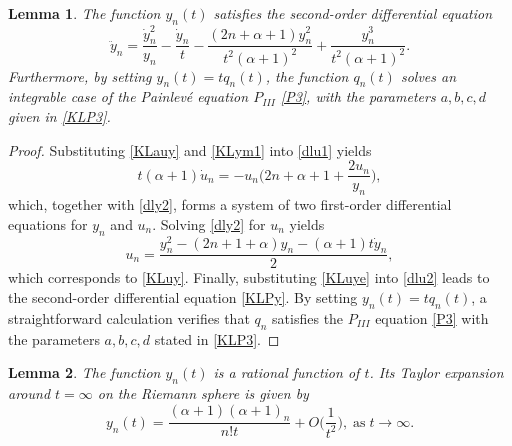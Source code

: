 \documentclass[10pt, reqno]{amsart}
\numberwithin{equation}{section}
\newtheorem{lemma}{Lemma}[section]
\numberwithin{equation}{section}
\begin{document}
\begin{lemma} \label{lemma 3.2}
The function $y_n(t)$ satisfies the second-order differential equation
\begin{equation}
\ddot{y}_n=\frac{\dot{y}_n^2}{y_n}-\frac{\dot{y}_n}{t}-\frac{(2n+\alpha+1)y_n^2}{t^2(\alpha+1)^2}+\frac{y_n^3}{t^2(\alpha+1)^2}.\label{KLPy}
\end{equation}
Furthermore, by setting $y_n(t)=tq_n(t)$, the function $q_n(t)$ solves an integrable case of the Painlevé equation $P_{III}$ \eqref{P3}, with the parameters $a,b,c,d$ given in \eqref{KLP3}.
\end{lemma}
\begin{proof}
Substituting \eqref{KLauy} and \eqref{KLym1} into \eqref{dlu1} yields
\begin{equation}
t(\alpha+1)\dot{u}_n=-u_n\Big(2n+\alpha+1+\frac{2u_n}{y_n}\Big),\label{dlu2}
\end{equation}
which, together with \eqref{dly2}, forms a system of two first-order differential equations for $y_n$ and $u_n$. Solving \eqref{dly2} for $u_n$ yields 
\begin{equation}
u_n=\frac{y_n ^2-(2n+1+\alpha)y_n-(\alpha+1)t\dot{y}_n}{2},\label{KLuye}
\end{equation}
which corresponds to \eqref{KLuy}. Finally, substituting \eqref{KLuye} into \eqref{dlu2} leads to the second-order differential equation \eqref{KLPy}. By setting $y_n(t)=tq_n(t)$, a straightforward calculation verifies that $q_n$ satisfies the $P_{III}$ equation \eqref{P3} with the parameters $a,b,c,d$ stated in \eqref{KLP3}.
\end{proof}
\begin{lemma} \label{lemma 3.3}
The function $y_n(t)$ is a rational function of $t$. Its Taylor expansion around $t=\infty$ on the Riemann sphere is given by
\begin{equation}
y_n(t)=\frac{(\alpha+1)(\alpha+1)_n}{n! t}+O\Big(\frac{1}{t^2}\Big),\;\mbox{as}\; t\to \infty.\label{aKLPy}
\end{equation}
\end{lemma}
\end{document}
